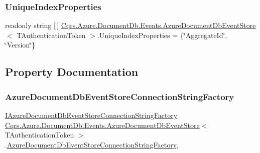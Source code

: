 \subsubsection{\texorpdfstring{Unique\+Index\+Properties}{UniqueIndexProperties}}
{\footnotesize\ttfamily readonly string \mbox{[}$\,$\mbox{]} \hyperlink{classCqrs_1_1Azure_1_1DocumentDb_1_1Events_1_1AzureDocumentDbEventStore}{Cqrs.\+Azure.\+Document\+Db.\+Events.\+Azure\+Document\+Db\+Event\+Store}$<$ T\+Authentication\+Token $>$.Unique\+Index\+Properties = \{\char`\"{}Aggregate\+Id\char`\"{}, \char`\"{}Version\char`\"{}\}\hspace{0.3cm}{\ttfamily [protected]}}



\subsection{Property Documentation}
\mbox{\label{classCqrs_1_1Azure_1_1DocumentDb_1_1Events_1_1AzureDocumentDbEventStore_a5a651f82c71bf8bd51114a3dc63a87a6_a5a651f82c71bf8bd51114a3dc63a87a6}} 
\subsubsection{\texorpdfstring{Azure\+Document\+Db\+Event\+Store\+Connection\+String\+Factory}{AzureDocumentDbEventStoreConnectionStringFactory}}
{\footnotesize\ttfamily \hyperlink{interfaceCqrs_1_1Azure_1_1DocumentDb_1_1Events_1_1IAzureDocumentDbEventStoreConnectionStringFactory}{I\+Azure\+Document\+Db\+Event\+Store\+Connection\+String\+Factory} \hyperlink{classCqrs_1_1Azure_1_1DocumentDb_1_1Events_1_1AzureDocumentDbEventStore}{Cqrs.\+Azure.\+Document\+Db.\+Events.\+Azure\+Document\+Db\+Event\+Store}$<$ T\+Authentication\+Token $>$.\hyperlink{classCqrs_1_1Azure_1_1DocumentDb_1_1Events_1_1AzureDocumentDbEventStoreConnectionStringFactory}{Azure\+Document\+Db\+Event\+Store\+Connection\+String\+Factory}\hspace{0.3cm}{\ttfamily [get]}, {\ttfamily [protected]}}

